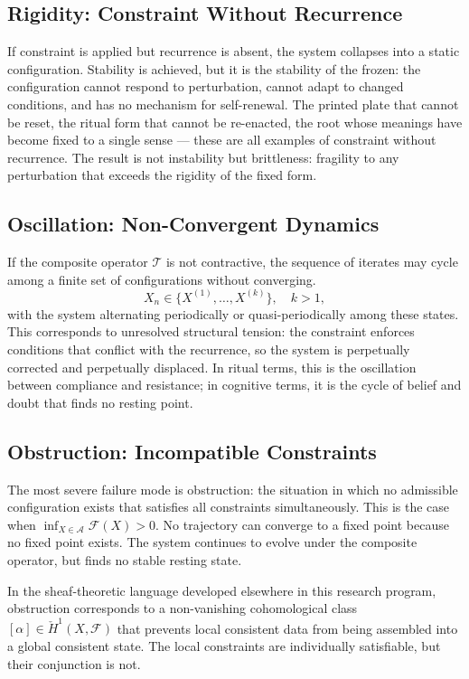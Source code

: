 \documentclass[12pt, oneside]{article}
\theoremstyle{definition}
\theoremstyle{remark}
\begin{document}
\subsection{Rigidity: Constraint Without Recurrence}

If constraint is applied but recurrence is absent, the system collapses into a static configuration.
Stability is achieved, but it is the stability of the frozen: the configuration cannot respond to perturbation, cannot adapt to changed conditions, and has no mechanism for self-renewal.
The printed plate that cannot be reset, the ritual form that cannot be re-enacted, the root whose meanings have become fixed to a single sense --- these are all examples of constraint without recurrence.
The result is not instability but brittleness: fragility to any perturbation that exceeds the rigidity of the fixed form.

\subsection{Oscillation: Non-Convergent Dynamics}

If the composite operator $\mathcal{T}$ is not contractive, the sequence of iterates may cycle among a finite set of configurations without converging.
\[
X_{n} \in \{X^{(1)}, \ldots, X^{(k)}\}, \quad k > 1,
\]
with the system alternating periodically or quasi-periodically among these states.
This corresponds to unresolved structural tension: the constraint enforces conditions that conflict with the recurrence, so the system is perpetually corrected and perpetually displaced.
In ritual terms, this is the oscillation between compliance and resistance; in cognitive terms, it is the cycle of belief and doubt that finds no resting point.

\subsection{Obstruction: Incompatible Constraints}

The most severe failure mode is obstruction: the situation in which no admissible configuration exists that satisfies all constraints simultaneously.
This is the case when $\inf_{X \in \mathcal{A}} \mathcal{F}(X) > 0$.
No trajectory can converge to a fixed point because no fixed point exists.
The system continues to evolve under the composite operator, but finds no stable resting state.

In the sheaf-theoretic language developed elsewhere in this research program, obstruction corresponds to a non-vanishing cohomological class $[\alpha] \in \check{H}^{1}(X, \mathcal{F})$ that prevents local consistent data from being assembled into a global consistent state.
The local constraints are individually satisfiable, but their conjunction is not.
\end{document}
